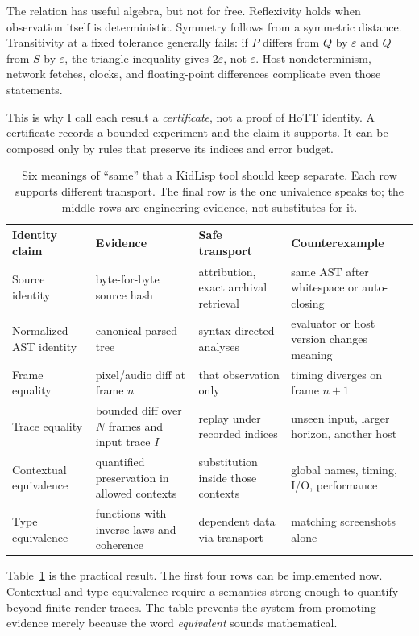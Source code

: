 \documentclass[10pt,letterpaper,twocolumn]{article}
\begin{document}
The relation has useful algebra, but not for free. Reflexivity holds when observation itself is deterministic. Symmetry follows from a symmetric distance. Transitivity at a fixed tolerance generally fails: if $P$ differs from $Q$ by $\varepsilon$ and $Q$ from $S$ by $\varepsilon$, the triangle inequality gives $2\varepsilon$, not $\varepsilon$. Host nondeterminism, network fetches, clocks, and floating-point differences complicate even those statements.

This is why I call each result a \emph{certificate}, not a proof of HoTT identity. A certificate records a bounded experiment and the claim it supports. It can be composed only by rules that preserve its indices and error budget.

\begin{table}[t]
\centering
\small
\begin{tabularx}{\textwidth}{@{}p{}p{}p{}X@{}}
\toprule
Identity claim & Evidence & Safe transport & Counterexample \\
\midrule
Source identity & byte-for-byte source hash & attribution, exact archival retrieval & same AST after whitespace or auto-closing \\
Normalized-AST identity & canonical parsed tree & syntax-directed analyses & evaluator or host version changes meaning \\
Frame equality & pixel/audio diff at frame $n$ & that observation only & timing diverges on frame $n+1$ \\
Trace equality & bounded diff over $N$ frames and input trace $I$ & replay under recorded indices & unseen input, larger horizon, another host \\
Contextual equivalence & quantified preservation in allowed contexts & substitution inside those contexts & global names, timing, I/O, performance \\
Type equivalence & functions with inverse laws and coherence & dependent data via transport & matching screenshots alone \\
\bottomrule
\end{tabularx}
\caption{Six meanings of ``same'' that a KidLisp tool should keep separate. Each row supports different transport. The final row is the one univalence speaks to; the middle rows are engineering evidence, not substitutes for it.}
\label{tab:identity-claims}
\end{table}

Table~\ref{tab:identity-claims} is the practical result. The first four rows can be implemented now. Contextual and type equivalence require a semantics strong enough to quantify beyond finite render traces. The table prevents the system from promoting evidence merely because the word \emph{equivalent} sounds mathematical.
\end{document}
